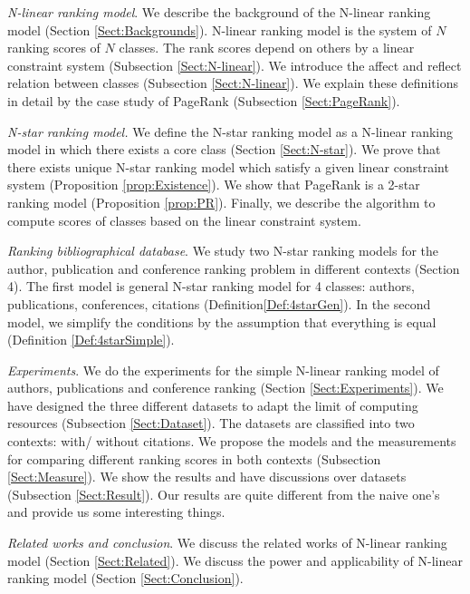 \documentclass[10pt,leqno,twoside]{article}
\begin{document}
\textit{N-linear ranking model}. We describe the background of the  N-linear ranking model (Section \ref{Sect:Backgrounds}). N-linear ranking model is the system of $N$ ranking scores of $N$ classes. The rank scores depend on others by a linear constraint system (Subsection \ref{Sect:N-linear}). We introduce the affect and reflect relation between classes (Subsection \ref{Sect:N-linear}). We explain these definitions in detail by the case study of PageRank (Subsection \ref{Sect:PageRank}).

\textit{N-star ranking model.} We define the N-star ranking model as a N-linear ranking model in which there exists a core class (Section \ref{Sect:N-star}). We prove that there exists unique N-star ranking model which satisfy  a given linear constraint system (Proposition \ref{prop:Existence}). We show that PageRank is a 2-star ranking model (Proposition \ref{prop:PR}). Finally, we describe the algorithm to compute scores of classes based on the linear constraint system.

\textit{Ranking bibliographical database}. We study two N-star ranking models for the author, publication and conference ranking problem in different contexts (Section 4).
The first model is general N-star ranking model for 4 classes: authors, publications, conferences, citations (Definition\ref{Def:4starGen}).
In the second model, we simplify the conditions by the assumption that everything is equal (Definition \ref{Def:4starSimple}).

\textit{Experiments}. We do the experiments for the simple  N-linear ranking model of authors, publications and conference ranking  (Section \ref{Sect:Experiments}). We have designed the three different datasets to adapt the limit of  computing resources (Subsection \ref{Sect:Dataset}). The datasets are classified into two contexts: with/ without citations.
We propose the models and the measurements for comparing different ranking scores in both contexts (Subsection \ref{Sect:Measure}). We show the results and have discussions over datasets (Subsection \ref{Sect:Result}).
Our results are quite different from the naive one's and provide us some interesting things.

\textit{Related works and conclusion}. We discuss the related works of N-linear ranking model (Section \ref{Sect:Related}).
We discuss the power and applicability of  N-linear ranking model (Section \ref{Sect:Conclusion}).




\end{document}
